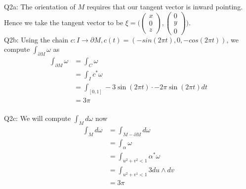 \documentclass[letterpaper]{article}
\newcommand{\bd}{\partial}
\begin{document}
\noindent Q2a: The orientation of $M$ requires that our tangent vector is inward pointing. Hence we take the tangent vector to be $\xi = \Big(\begin{pmatrix} x \\ 0 \\ z \end{pmatrix}, \begin{pmatrix} 0 \\ y\\ 0\end{pmatrix} \Big)$. 
\newline \\ Q2b: Using the chain $c:I\to \bd M, c(t) = (-sin(2\pi t), 0 ,-cos(2\pi t))$, we compute $\int_{\bd M}\omega$ as 
\begin{align*}
    \int_{\bd M} \omega & = \int_{C} \omega 
    \\ & = \int_{I} c^\ast\omega
    \\ & = \int_{[0,1]} -3\sin(2\pi t)\cdot -2\pi \sin(2 \pi t) dt
    \\ & = 3\pi
\end{align*}
\newline \\ Q2c: We will compute $\int_{M}d\omega$ now
\begin{align*}
    \int_{M} d\omega & = \int_{M -\bd M}d\omega 
    \\ & = \int_{\alpha} \omega
    \\ & = \int_{u^2+v^2<1} \alpha^\ast \omega
    \\ & = \int_{u^2+v^1<1} 3du\wedge dv 
    \\ & = 3\pi
\end{align*}
\end{document}
